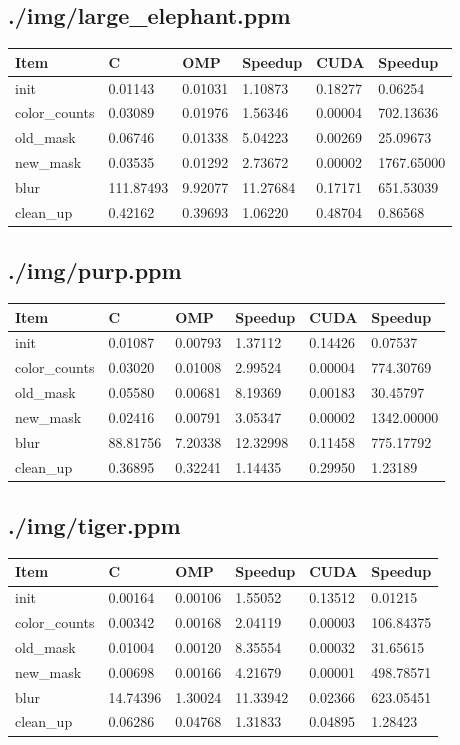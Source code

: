 \documentclass[12pt]{article}
\begin{document}
\subsection{./img/large_elephant.ppm}
\begin{tabular}{l|l|l|l|l|l}
    Item & C & OMP & Speedup & CUDA & Speedup
\\  \hline
    init & 0.01143 & 0.01031 & 1.10873 & 0.18277 & 0.06254
\\  color_counts & 0.03089 & 0.01976 & 1.56346 & 0.00004 & 702.13636
\\  old_mask & 0.06746 & 0.01338 & 5.04223 & 0.00269 & 25.09673
\\  new_mask & 0.03535 & 0.01292 & 2.73672 & 0.00002 & 1767.65000
\\  blur & 111.87493 & 9.92077 & 11.27684 & 0.17171 & 651.53039
\\  clean_up & 0.42162 & 0.39693 & 1.06220 & 0.48704 & 0.86568
\end{tabular}
\subsection{./img/purp.ppm}
\begin{tabular}{l|l|l|l|l|l}
    Item & C & OMP & Speedup & CUDA & Speedup
\\  \hline
    init & 0.01087 & 0.00793 & 1.37112 & 0.14426 & 0.07537
\\  color_counts & 0.03020 & 0.01008 & 2.99524 & 0.00004 & 774.30769
\\  old_mask & 0.05580 & 0.00681 & 8.19369 & 0.00183 & 30.45797
\\  new_mask & 0.02416 & 0.00791 & 3.05347 & 0.00002 & 1342.00000
\\  blur & 88.81756 & 7.20338 & 12.32998 & 0.11458 & 775.17792
\\  clean_up & 0.36895 & 0.32241 & 1.14435 & 0.29950 & 1.23189
\end{tabular}
\subsection{./img/tiger.ppm}
\begin{tabular}{l|l|l|l|l|l}
    Item & C & OMP & Speedup & CUDA & Speedup
\\  \hline
    init & 0.00164 & 0.00106 & 1.55052 & 0.13512 & 0.01215
\\  color_counts & 0.00342 & 0.00168 & 2.04119 & 0.00003 & 106.84375
\\  old_mask & 0.01004 & 0.00120 & 8.35554 & 0.00032 & 31.65615
\\  new_mask & 0.00698 & 0.00166 & 4.21679 & 0.00001 & 498.78571
\\  blur & 14.74396 & 1.30024 & 11.33942 & 0.02366 & 623.05451
\\  clean_up & 0.06286 & 0.04768 & 1.31833 & 0.04895 & 1.28423
\end{tabular}
\end{document}
